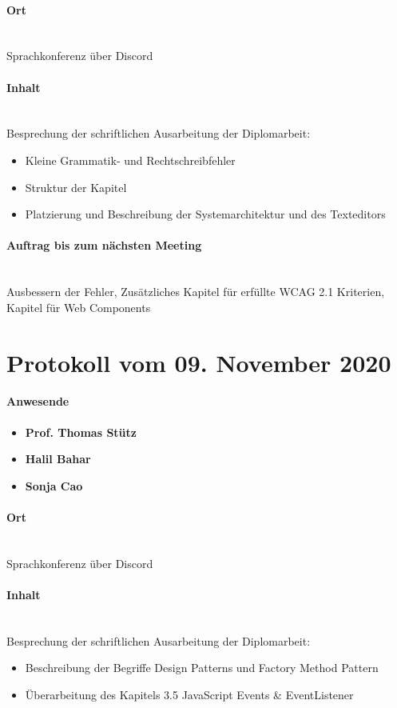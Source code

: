 \paragraph{Ort}\mbox{}\\
Sprachkonferenz über Discord

\paragraph{Inhalt}\mbox{}\\
Besprechung der schriftlichen Ausarbeitung der Diplomarbeit:
\begin{itemize}
	\item{Kleine Grammatik- und Rechtschreibfehler}
	\item{Struktur der Kapitel}
	\item{Platzierung und Beschreibung der Systemarchitektur und des Texteditors}
\end{itemize}

\paragraph{Auftrag bis zum nächsten Meeting}\mbox{}\\
Ausbessern der Fehler, Zusätzliches Kapitel für erfüllte WCAG 2.1 Kriterien, Kapitel für Web Components

\section{Protokoll vom 09. November 2020}

\paragraph{Anwesende}
\begin{itemize}
	\item{\textbf{Prof. Thomas Stütz}}
	\item{\textbf{Halil Bahar}}
	\item{\textbf{Sonja Cao}}
\end{itemize}

\paragraph{Ort}\mbox{}\\
Sprachkonferenz über Discord

\paragraph{Inhalt}\mbox{}\\
Besprechung der schriftlichen Ausarbeitung der Diplomarbeit:
\begin{itemize}
	\item{Beschreibung der Begriffe Design Patterns und Factory Method Pattern}
	\item{Überarbeitung des Kapitels 3.5 JavaScript Events \& EventListener}
\end{itemize}

